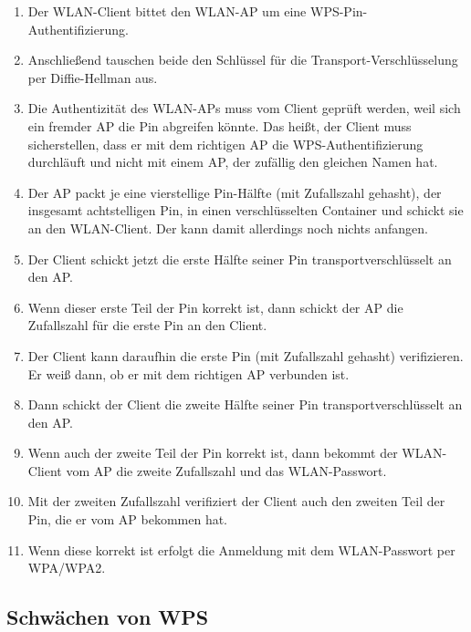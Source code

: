 \begin{enumerate}
	\item Der WLAN-Client bittet den WLAN-AP um eine WPS-Pin-Authentifizierung.
	\item Anschließend tauschen beide den Schlüssel für die Transport-Verschlüsselung per Diffie-Hellman aus.
	\item Die Authentizität des WLAN-APs muss vom Client geprüft werden, weil sich ein fremder AP die Pin abgreifen könnte. Das heißt, der Client muss sicherstellen, dass er mit dem richtigen AP die WPS-Authentifizierung durchläuft und nicht mit einem AP, der zufällig den gleichen Namen hat.
	\item Der AP packt je eine vierstellige Pin-Hälfte (mit Zufallszahl gehasht), der insgesamt achtstelligen Pin, in einen verschlüsselten Container und schickt sie an den WLAN-Client. Der kann damit allerdings noch nichts anfangen.
	\item Der Client schickt jetzt die erste Hälfte seiner Pin transportverschlüsselt an den AP.
	\item Wenn dieser erste Teil der Pin korrekt ist, dann schickt der AP die Zufallszahl für die erste Pin an den Client.
	\item Der Client kann daraufhin die erste Pin (mit Zufallszahl gehasht) verifizieren. Er weiß dann, ob er mit dem richtigen AP verbunden ist.
	\item Dann schickt der Client die zweite Hälfte seiner Pin transportverschlüsselt an den AP.
	\item Wenn auch der zweite Teil der Pin korrekt ist, dann bekommt der WLAN-Client vom AP die zweite Zufallszahl und das WLAN-Passwort.
	\item Mit der zweiten Zufallszahl verifiziert der Client auch den zweiten Teil der Pin, die er vom AP bekommen hat.
	\item Wenn diese korrekt ist erfolgt die Anmeldung mit dem WLAN-Passwort per WPA/WPA2.
\end{enumerate}

\subsection{Schwächen von WPS}

